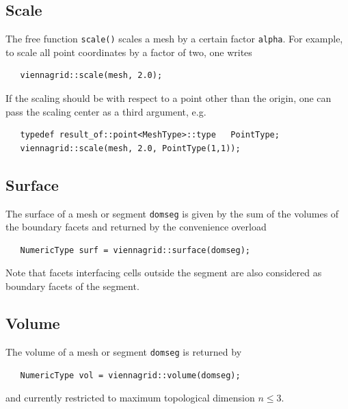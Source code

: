  \subsection{Scale}
 The free function \lstinline|scale()| scales a mesh by a certain factor \lstinline|alpha|. For example, to scale all point coordinates by a factor of two, one writes
  \begin{lstlisting}
   viennagrid::scale(mesh, 2.0);
  \end{lstlisting}
  If the scaling should be with respect to a point other than the origin, one can pass the scaling center as a third argument, e.g.
  \begin{lstlisting}
   typedef result_of::point<MeshType>::type   PointType;
   viennagrid::scale(mesh, 2.0, PointType(1,1));
  \end{lstlisting}

 \subsection{Surface}
 The surface of a mesh or segment \lstinline|domseg| is given by the sum of the volumes of the boundary facets and returned by the convenience overload
  \begin{lstlisting}
   NumericType surf = viennagrid::surface(domseg);
  \end{lstlisting}
  Note that facets interfacing cells outside the segment are also considered as boundary facets of the segment.


  \subsection{Volume}
  The volume of a mesh or segment \lstinline|domseg| is returned by
  \begin{lstlisting}
   NumericType vol = viennagrid::volume(domseg);
  \end{lstlisting}
  and currently restricted to maximum topological dimension $n \leq 3$.



